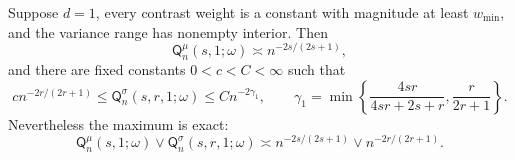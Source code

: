 Suppose \(d=1\), every contrast weight is a constant with magnitude at least \(w_{\min}\), and the variance range has nonempty interior.  Then
\[
\mathsf Q_n^{\mu}(s,1;\omega)\asymp n^{-2s/(2s+1)},
\]
and there are fixed constants \(0<c<C<\infty\) such that
\[
c n^{-2r/(2r+1)}
\leq\mathsf Q_n^{\sigma}(s,r,1;\omega)
\leq C n^{-2\gamma_1},
\qquad
\gamma_1=\min\left\{\frac{4sr}{4sr+2s+r},\frac{r}{2r+1}\right\}.
\]
Nevertheless the maximum is exact:
\[
\mathsf Q_n^{\mu}(s,1;\omega)\vee\mathsf Q_n^{\sigma}(s,r,1;\omega)
\asymp n^{-2s/(2s+1)}\vee n^{-2r/(2r+1)}.
\]